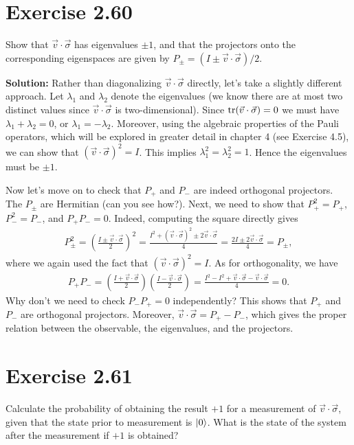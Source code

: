 \documentclass{book}
\begin{document}
\section*{Exercise 2.60}
    Show that $\vec{v} \cdot \vec{\sigma}$ has eigenvalues $\pm 1$, and that the projectors onto the corresponding eigenspaces are given by $P_\pm = (I \pm \vec{v} \cdot \vec{\sigma})/2$.

    \textbf{Solution:} Rather than diagonalizing $\vec{v}\cdot \vec{\sigma}$ directly, let's take a slightly different approach. Let $\lambda_1$ and $\lambda_2$ denote the eigenvalues (we know there are at most two distinct values since $\vec{v}\cdot \vec{\sigma}$ is two-dimensional). Since $\tr(\vec{v}\cdot \vec{\sigma}) = 0$ we must have $\lambda_1 + \lambda_2 = 0$, or $\lambda_1 = -\lambda_2$. Moreover, using the algebraic properties of the Pauli operators, which will be explored in greater detail in chapter 4 (see Exercise 4.5), we can show that $(\vec{v}\cdot \vec{\sigma})^2 = I$. This implies $\lambda_1^2 = \lambda_2^2 = 1$. Hence the eigenvalues must be $\pm 1$. 

    Now let's move on to check that $P_+$ and $P_-$ are indeed orthogonal projectors. The $P_{\pm}$ are Hermitian (can you see how?). Next, we need to show that $P_+^2 = P_+$, $P_-^2 = P_-$, and $P_+ P_- = 0$. Indeed, computing the square directly gives
    \begin{align}
        P_{\pm}^2 = \left(\frac{I \pm \vec{v}\cdot \vec{\sigma}}{2}\right)^2 = \frac{I^2 + (\vec{v}\cdot \vec{\sigma})^2 \pm 2 \vec{v}\cdot \vec{\sigma}}{4} = \frac{2 I \pm 2 \vec{v}\cdot \vec{\sigma}}{4} = P_\pm,
    \end{align}
    where we again used the fact that $(\vec{v}\cdot \vec{\sigma})^2 = I$. As for orthogonality, we have
    \begin{align}
        P_+ P_- = \left(\frac{I + \vec{v}\cdot \vec{\sigma}}{2}\right) \left(\frac{I - \vec{v}\cdot \vec{\sigma}}{2}\right) = \frac{I^2 - I^2 + \vec{v}\cdot \vec{\sigma} - \vec{v}\cdot \vec{\sigma}}{4} = 0.
    \end{align}
    Why don't we need to check $P_- P_+ = 0$ independently? This shows that $P_+$ and $P_-$ are orthogonal projectors. Moreover, $\vec{v} \cdot \vec{\sigma} = P_+ - P_-$, which gives the proper relation between the observable, the eigenvalues, and the projectors.

\section*{Exercise 2.61}
    Calculate the probability of obtaining the result $+1$ for a measurement of $\vec{v} \cdot \vec{\sigma}$, given that the state prior to measurement is $\ket{0}$. What is the state of the system after the measurement if $+1$ is obtained?
\end{document}
